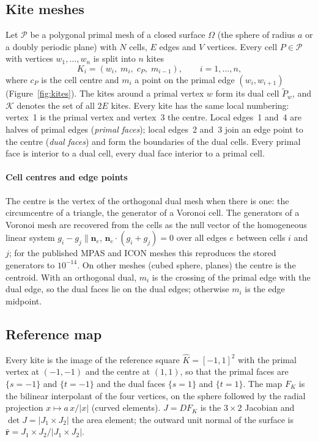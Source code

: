\documentclass[preprint,12pt]{elsarticle}
\newcommand{\bn}{\mathbf{n}}
\newcommand{\rhat}{\hat{\mathbf{r}}}
\newcommand{\Pc}{\mathcal{P}}
\newcommand{\Kc}{\mathcal{K}}
\theoremstyle{definition}
\begin{document}
\subsection{Kite meshes}
Let $\Pc$ be a polygonal primal mesh of a closed surface $\Omega$ (the sphere of radius $a$ or a doubly
periodic plane) with $N$ cells, $E$ edges and $V$ vertices. Every cell $P\in\Pc$ with vertices
$w_1,\dots,w_n$ is split into $n$ kites
\[
  K_i = (w_i,\; m_i,\; c_P,\; m_{i-1}),\qquad i = 1,\dots,n,
\]
where $c_P$ is the cell centre and $m_i$ a point on the primal edge $(w_i,w_{i+1})$
(Figure~\ref{fig:kites}). The kites around a primal vertex $w$ form its dual cell $\widetilde P_w$, and
$\Kc$ denotes the set of all $2E$ kites. Every kite has the same local numbering: vertex~1 is the primal
vertex and vertex~3 the centre. Local edges~1 and~4 are halves of primal edges (\emph{primal faces});
local edges~2 and~3 join an edge point to the centre (\emph{dual faces}) and form the boundaries of the
dual cells. Every primal face is interior to a dual cell, every dual face interior to a primal cell.

\paragraph{Cell centres and edge points} The centre is the vertex of the orthogonal dual mesh when
there is one: the circumcentre of a triangle, the generator of a Voronoi cell. The generators of a Voronoi
mesh are recovered from the cells as the null vector of the homogeneous linear system
$g_i - g_j\parallel\bn_e$, $\bn_e\cdot(g_i+g_j) = 0$ over all edges $e$ between cells $i$ and $j$; for
the published MPAS and ICON meshes this reproduces the stored generators to $10^{-14}$. On other meshes
(cubed sphere, planes) the centre is the centroid. With an orthogonal dual, $m_i$ is the crossing of the
primal edge with the dual edge, so the dual faces lie on the dual edges; otherwise $m_i$ is the edge
midpoint.

\subsection{Reference map}
Every kite is the image of the reference square $\hat K = [-1,1]^2$ with the primal vertex at $(-1,-1)$
and the centre at $(1,1)$, so that the primal faces are $\{s = -1\}$ and $\{t = -1\}$ and the dual faces
$\{s = 1\}$ and $\{t = 1\}$. The map $F_K$ is the bilinear interpolant of the four vertices, on the sphere
followed by the radial projection $x\mapsto a\,x/|x|$ (curved elements). $J = DF_K$ is the $3\times2$
Jacobian and $\det J = |J_1\times J_2|$ the area element; the outward unit normal of the surface is
$\rhat = J_1\times J_2/|J_1\times J_2|$.
\end{document}
